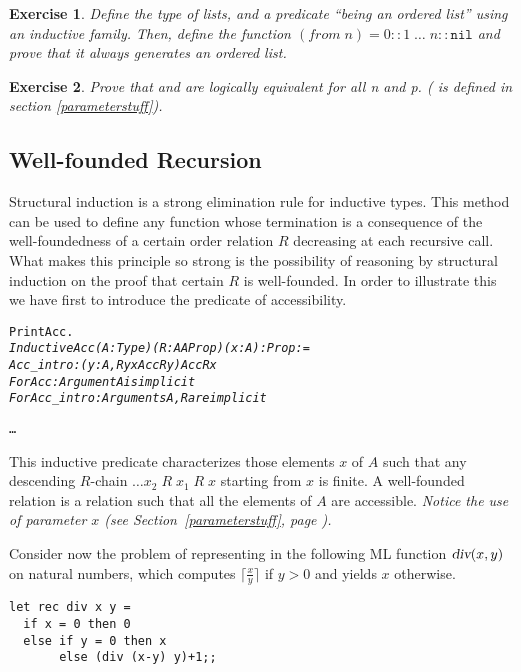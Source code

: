 \documentclass[11pt]{article}
\newtheorem{exercise}{Exercise}[section]
\begin{document}
\begin{exercise} \label{zeroton}
Define the type of lists, and a predicate ``being an ordered list''
using an inductive family. Then, define the function
$(from\;n)=0::1\;\ldots\; n::\texttt{nil}$ and prove that it always generates an
ordered list.
\end{exercise}

\begin{exercise}
Prove that  and  are logically equivalent
for all n and p. ( is defined in section \ref{parameterstuff}).
\end{exercise}


\subsection{Well-founded Recursion}
\label{WellFoundedRecursion}

Structural induction is a strong elimination rule for inductive types.
This method can be used to define any function whose termination is
a consequence of the well-foundedness of a certain order relation $R$ decreasing
at each recursive call. What makes this principle so strong is the
possibility of reasoning by structural induction on the proof that
certain $R$ is well-founded.  In order to illustrate this we have
first to introduce the predicate of accessibility.

\begin{alltt}
Print Acc.
\it
Inductive Acc (A : Type) (R : A {\arrow} A {\arrow} Prop) (x:A) : Prop :=
    Acc_intro : ({\prodsym} y : A, R y x {\arrow} Acc R y) {\arrow} Acc R x
For Acc: Argument A is implicit
For Acc_intro: Arguments A, R are implicit

\dots
\end{alltt}

\noindent This inductive predicate characterizes those elements $x$ of
$A$ such that any descending $R$-chain $\ldots x_2\;R\;x_1\;R\;x$
starting from $x$ is finite. A well-founded relation is a relation
such that all the elements of $A$ are accessible.  
\emph{Notice the use of parameter $x$ (see Section~\ref{parameterstuff}, page
\pageref{parameterstuff}).}

Consider now the problem of representing in {\coq} the following ML
function $\textsl{div}(x,y)$ on natural numbers, which computes
$\lceil\frac{x}{y}\rceil$ if $y>0$ and yields $x$ otherwise.

\begin{verbatim}
let rec div x y = 
  if x = 0 then 0
  else if y = 0 then x
       else (div (x-y) y)+1;;
\end{verbatim}
\end{document}
